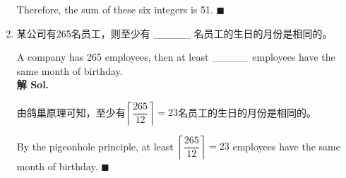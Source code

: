 \documentclass{ctexart}
\begin{document}
\begin{enumerate}
          Therefore, the sum of these six integers is 51. \hfill $\blacksquare$

    \item 某公司有265名员工，则至少有 \_\_\_\_\_ 名员工的生日的月份是相同的。

          A company has 265 employees, then at least \_\_\_\_\_ employees have the same
          month of birthday.\\

          \textbf{解 Sol.}

          由鸽巢原理可知，至少有$\left\lceil \dfrac{265}{12} \right\rceil = 23$名员工的生日的月份是相同的。

          By the pigeonhole principle, at least $\left\lceil \dfrac{265}{12} \right\rceil
              = 23$ employees have the same month of birthday. \hfill $\blacksquare$
\end{enumerate}
\end{document}
